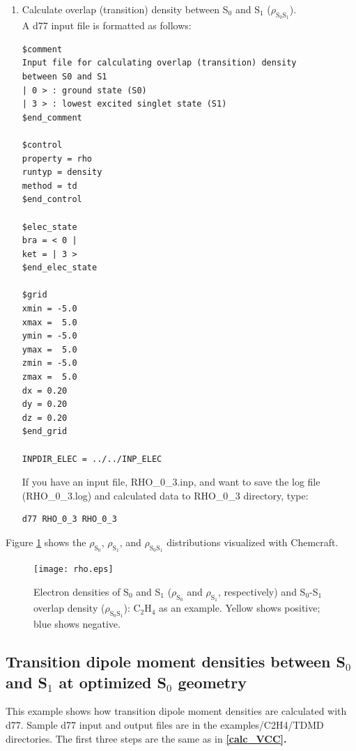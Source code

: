 ﻿\documentclass[11pt,a4paper,openany]{article}
\begin{document}
\begin{enumerate}
\item{
Calculate overlap (transition) density between S$_0$ and S$_1$ ($\rho_{\mathrm{S}_0\mathrm{S}_1}$).\\
A d77 input file is formatted as follows:
\begin{verbatim}
$comment
Input file for calculating overlap (transition) density
between S0 and S1
| 0 > : ground state (S0)
| 3 > : lowest excited singlet state (S1)
$end_comment

$control
property = rho
runtyp = density
method = td
$end_control

$elec_state
bra = < 0 |
ket = | 3 >
$end_elec_state

$grid
xmin = -5.0
xmax =  5.0
ymin = -5.0
ymax =  5.0
zmin = -5.0
zmax =  5.0
dx = 0.20
dy = 0.20
dz = 0.20
$end_grid

INPDIR_ELEC = ../../INP_ELEC
\end{verbatim}
If you have an input file, RHO\_0\_3.inp, and want to save the log file (RHO\_0\_3.log) and calculated data to RHO\_0\_3 directory, type:
\begin{verbatim} 
d77 RHO_0_3 RHO_0_3
\end{verbatim}
}
\end{enumerate}

Figure \ref{fig:rho} shows the $\rho_{\mathrm{S}_0}$, $\rho_{\mathrm{S}_1}$, and $\rho_{\mathrm{S}_0\mathrm{S}_1}$ distributions visualized with Chemcraft.\\
\begin{figure}[h]
\centering
\texttt{[image: rho.eps]}
\caption{
Electron densities of S$_0$ and S$_1$ ($\rho_{\mathrm{S}_0}$ and $\rho_{\mathrm{S}_1}$, respectively) 
and S$_0$-S$_1$ overlap density ($\rho_{\mathrm{S}_0\mathrm{S}_1}$): C$_2$H$_4$ as an example.
Yellow shows positive; blue shows negative.
}
\label{fig:rho}
\end{figure}

\subsection{Transition dipole moment densities between S$_0$ and S$_1$ at optimized S$_0$ geometry}
This example shows how transition dipole moment densities are calculated with d77. 
Sample d77 input and output files are in the examples/C2H4/TDMD directories. The first three steps are the same as in \bf{\ref{calc_VCC}}\rm{.}
\end{document}
